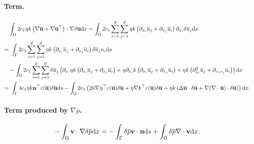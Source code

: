 \documentclass[oneside,11pt]{book}
\numberwithin{equation}{section}
\begin{document}
\paragraph*{Term.}
\begin{align*}
    &\int_\Omega 2c_1\eta k\left(\nabla\overline{\bf u} + \nabla\overline{\bf u}^\top\right):\nabla\delta\overline{\bf u}{\rm d}x = \int_\Omega 2c_1\sum_{i=1}^d\sum_{j=1}^d \eta k\left(\partial_{x_i}\overline{u}_j + \partial_{x_j}\overline{u}_i\right)\partial_{x_i}\delta\overline{u}_j{\rm d}x\\
    =&\ \int_\Gamma 2c_1\sum_{i=1}^d\sum_{j=1}^d \eta k\left(\partial_{x_i}\overline{u}_j + \partial_{x_j}\overline{u}_i\right)\delta\overline{u}_jn_i{\rm d}s\\
    &-\int_\Omega 2c_1\sum_{i=1}^d\sum_{j=1}^d \delta\overline{u}_j\left(\partial_{x_i}\eta k\left(\partial_{x_i}\overline{u}_j + \partial_{x_j}\overline{u}_i\right) + \eta\partial_{x_i}k\left(\partial_{x_i}\overline{u}_j + \partial_{x_j}\overline{u}_i\right) + \eta k\left(\partial_{x_i}^2\overline{u}_j + \partial_{x_ix_j}\overline{u}_i\right)\right){\rm d}x\\
    =&\ \int_\Gamma 4c_1\eta k{\bf n}^\top\varepsilon(\overline{\bf u})\delta\overline{\bf u}{\rm d}s - \int_\Omega 2c_1\left(2k\nabla\eta^\top\varepsilon(\overline{\bf u})\delta\overline{\bf u} + \eta\nabla k^\top\varepsilon(\overline{\bf u})\delta\overline{\bf u} + \eta k\left(\Delta\overline{\bf u}\cdot\delta\overline{\bf u} + \nabla(\nabla\cdot\overline{\bf u})\cdot\delta\overline{\bf u}\right)\right){\rm d}x.
\end{align*}
\paragraph*{Term produced by $\nabla\overline{p}$.}
\begin{align*}
    -\int_\Omega {\bf v}\cdot\nabla\delta\overline{p}{\rm d}x = - \int_\Gamma \delta\overline{p}{\bf v}\cdot{\bf n}{\rm d}s + \int_\Omega \delta\overline{p}\nabla\cdot{\bf v}{\rm d}x.
\end{align*}
\end{document}
